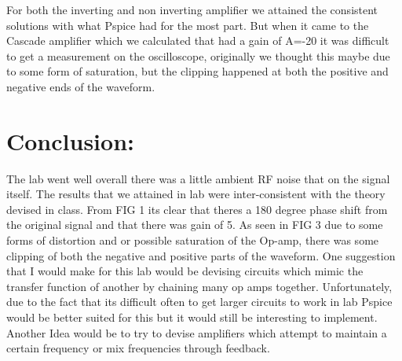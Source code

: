 \documentclass[10pt,a4paper]{article}
\begin{document}
For both the inverting and non inverting amplifier we attained the consistent solutions with what Pspice had for the most part. But when it came to the Cascade amplifier which we calculated that had a gain of A=-20  it was difficult to get a measurement on the oscilloscope, originally we thought this maybe due to some form of saturation, but the clipping happened at both the positive and negative ends of the waveform.




\section*{Conclusion:}
The lab went well overall there was a little ambient RF noise that on the signal itself. The results that we attained in lab were inter-consistent with the theory devised in class.  From FIG 1 its clear that theres a 180 degree phase shift from the original signal and that there was gain of 5. As seen in FIG 3  due to some forms of distortion and or possible saturation of the Op-amp, there was some clipping of both the negative and positive parts of the waveform. One suggestion that I would make for this lab would be devising circuits which mimic the transfer function of another by chaining many op amps together. Unfortunately, due to the fact that its difficult often to get larger circuits to work in lab Pspice would be better suited for this but it would still be interesting to implement. Another Idea would be to try to devise amplifiers which attempt to maintain a certain frequency or mix frequencies through feedback. 
 
 
\end{document}
